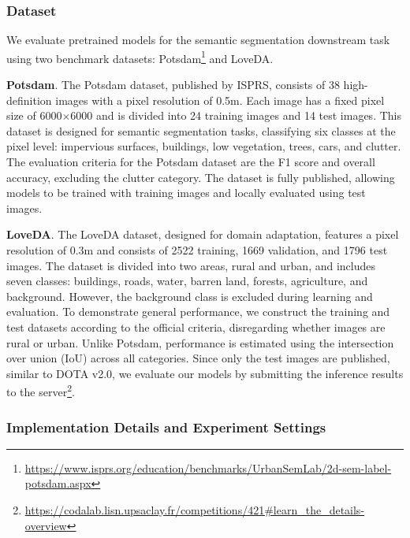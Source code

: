 \subsubsection{Dataset}
We evaluate pretrained models for the semantic segmentation downstream task using two benchmark datasets: Potsdam\footnote{\url{https://www.isprs.org/education/benchmarks/UrbanSemLab/2d-sem-label-potsdam.aspx}} and LoveDA.

\textbf{Potsdam}. The Potsdam dataset, published by ISPRS, consists of 38 high-definition images with a pixel resolution of 0.5m. Each image has a fixed pixel size of 6000$\times$6000 and is divided into 24 training images and 14 test images. This dataset is designed for semantic segmentation tasks, classifying six classes at the pixel level: impervious surfaces, buildings, low vegetation, trees, cars, and clutter. The evaluation criteria for the Potsdam dataset are the F1 score and overall accuracy, excluding the clutter category. The dataset is fully published, allowing models to be trained with training images and locally evaluated using test images.

\textbf{LoveDA}. The LoveDA dataset, designed for domain adaptation, features a pixel resolution of 0.3m and consists of 2522 training, 1669 validation, and 1796 test images. The dataset is divided into two areas, rural and urban, and includes seven classes: buildings, roads, water, barren land, forests, agriculture, and background. However, the background class is excluded during learning and evaluation. To demonstrate general performance, we construct the training and test datasets according to the official criteria, disregarding whether images are rural or urban. Unlike Potsdam, performance is estimated using the intersection over union (IoU) across all categories. Since only the test images are published, similar to DOTA v2.0, we evaluate our models by submitting the inference results to the server\footnote{\url{https://codalab.lisn.upsaclay.fr/competitions/421\#learn_the_details-overview}}.

\subsubsection{Implementation Details and Experiment Settings}

